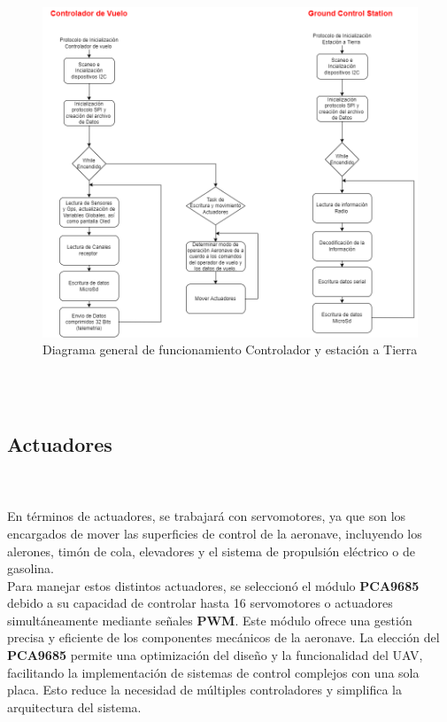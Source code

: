 \begin{figure}[H]
    \centering
    \includegraphics[width=\textwidth]{Imagenes/Interfaz/diagrama general de codigo.png}
    \caption{Diagrama general de funcionamiento Controlador y estación a Tierra }
    \label{fig:diag-codigo }
\end{figure} \\ \\




\subsection{Actuadores} \\ \\


En términos de actuadores, se trabajará con servomotores, ya que son los encargados de mover las superficies de control de la aeronave, incluyendo los alerones, timón de cola, elevadores y el sistema de propulsión eléctrico o de gasolina. \\ 

Para manejar estos distintos actuadores, se seleccionó el módulo \textbf{PCA9685} debido a su capacidad de controlar hasta 16 servomotores o actuadores simultáneamente mediante señales \textbf{PWM}. Este módulo ofrece una gestión precisa y eficiente de los componentes mecánicos de la aeronave. La elección del \textbf{PCA9685} permite una optimización del diseño y la funcionalidad del UAV, facilitando la implementación de sistemas de control complejos con una sola placa. Esto reduce la necesidad de múltiples controladores y simplifica la arquitectura del sistema. \\ \\

